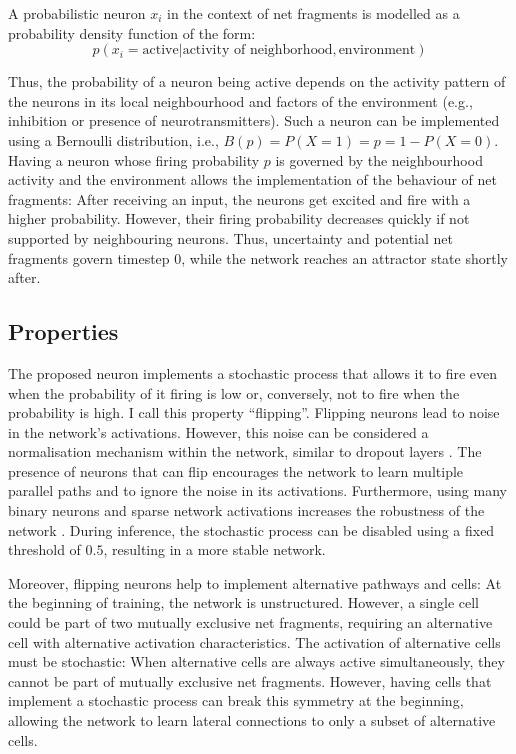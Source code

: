 A probabilistic neuron $x_i$ in the context of net fragments is modelled as a probability density function of the form:
\begin{equation}
    p(x_i = \text{active} | \text{activity of neighborhood}, \text{environment}) 
\end{equation}

Thus, the probability of a neuron being active depends on the activity pattern of the neurons in its local neighbourhood and factors of the environment (e.g., inhibition or presence of neurotransmitters).
Such a neuron can be implemented using a Bernoulli distribution, i.e., $B(p) = P(X = 1) = p = 1 - P(X=0)$. Having a neuron whose firing probability $p$ is governed by the neighbourhood activity and the environment allows the implementation of the behaviour of net fragments: After receiving an input, the neurons get excited and fire with a higher probability. However, their firing probability decreases quickly if not supported by neighbouring neurons. Thus, uncertainty and potential net fragments govern timestep 0, while the network reaches an attractor state shortly after. 

\subsection{Properties}
The proposed neuron implements a stochastic process that allows it to fire even when the probability of it firing is low or, conversely, not to fire when the probability is high.
I call this property ``flipping''.
Flipping neurons lead to noise in the network's activations.
However, this noise can be considered a normalisation mechanism within the network, similar to dropout layers .
The presence of neurons that can flip encourages the network to learn multiple parallel paths and to ignore the noise in its activations.
Furthermore, using many binary neurons and sparse network activations increases the robustness of the network .
During inference, the stochastic process can be disabled using a fixed threshold of $0.5$, resulting in a more stable network.

Moreover, flipping neurons help to implement alternative pathways and cells: At the beginning of training, the network is unstructured.
However, a single cell could be part of two mutually exclusive net fragments, requiring an alternative cell with alternative activation characteristics.
The activation of alternative cells must be stochastic:
When alternative cells are always active simultaneously, they cannot be part of mutually exclusive net fragments.
However, having cells that implement a stochastic process can break this symmetry at the beginning, allowing the network to learn lateral connections to only a subset of alternative cells.

